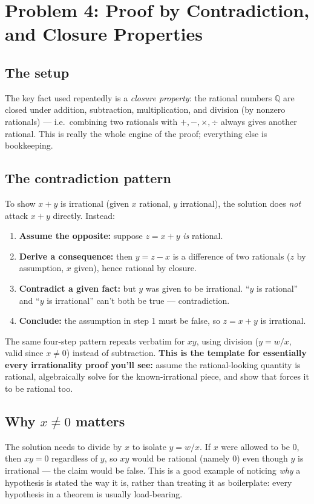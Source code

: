 \documentclass[11pt]{article}
\begin{document}
\section*{Problem 4: Proof by Contradiction, and Closure Properties}

\subsection*{The setup}
The key fact used repeatedly is a \emph{closure property}: the
rational numbers $\mathbb{Q}$ are closed under addition, subtraction,
multiplication, and division (by nonzero rationals) --- i.e.\
combining two rationals with $+,-,\times,\div$ always gives another
rational. This is really the whole engine of the proof; everything
else is bookkeeping.

\subsection*{The contradiction pattern}
To show $x+y$ is irrational (given $x$ rational, $y$ irrational), the
solution does \emph{not} attack $x+y$ directly. Instead:
\begin{enumerate}
  \item \textbf{Assume the opposite:} suppose $z = x+y$ \emph{is}
        rational.
  \item \textbf{Derive a consequence:} then $y = z - x$ is a difference
        of two rationals ($z$ by assumption, $x$ given), hence
        rational by closure.
  \item \textbf{Contradict a given fact:} but $y$ was given to be
        irrational. ``$y$ is rational'' and ``$y$ is irrational''
        can't both be true --- contradiction.
  \item \textbf{Conclude:} the assumption in step 1 must be false, so
        $z=x+y$ is irrational.
\end{enumerate}
The same four-step pattern repeats verbatim for $xy$, using division
($y = w/x$, valid since $x\ne 0$) instead of subtraction. \textbf{This
is the template for essentially every irrationality proof you'll see:}
assume the rational-looking quantity is rational, algebraically solve
for the known-irrational piece, and show that forces it to be rational
too.

\subsection*{Why $x \ne 0$ matters}
The solution needs to divide by $x$ to isolate $y = w/x$. If $x$ were
allowed to be $0$, then $xy = 0$ regardless of $y$, so $xy$ would be
rational (namely $0$) even though $y$ is irrational --- the claim
would be false. This is a good example of noticing \emph{why} a
hypothesis is stated the way it is, rather than treating it as
boilerplate: every hypothesis in a theorem is usually load-bearing.
\end{document}
